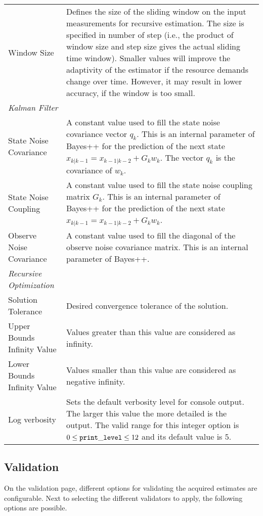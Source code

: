 \begin{tabularx}{\textwidth}{lX}
        Window Size &  Defines the size of the sliding window on the input
        measurements for recursive estimation. The
        size is specified in number of step (i.e., the product
        of window size and step size gives the actual sliding
        time window). Smaller values will improve the
        adaptivity of the estimator if the resource demands
        change over time. However, it may result in lower
        accuracy, if the window is too small.\\
        \textit{Kalman Filter} \\
        State Noise Covariance & A constant value used to fill the state noise covariance
        vector $q_k$. This is an internal parameter
        of Bayes++ for the prediction of the next state $ x_{k| k-1} = x_{k-1| k-2} + G_kw_k$. The vector $q_k$ is the
        covariance of $w_k$.\\
        State Noise Coupling &  A constant value used to fill the state noise coupling
        matrix $G_k$. This is an internal parameter
        of Bayes++ for the prediction of the next state
        $x_{k|k-1} = x_{k-1|k-2} + G_kw_k$.\\
        Observe Noise Covariance & A constant value used to fill the diagonal of the
        observe noise covariance matrix. This is an internal
        parameter of Bayes++. \\
        \textit{Recursive Optimization}\\
        Solution Tolerance & Desired convergence tolerance of the solution.\\
        Upper Bounds Infinity Value & Values greater than this value are considered as infinity. \\
        Lower Bounds Infinity Value & Values smaller than this value are considered as negative infinity.
\\
        Log verbosity & Sets the default verbosity level for console output. The larger this value the more detailed is the output. The valid range for this integer option is $ 0 \le {\tt print\_level } \le 12$ and its default value is $5$. \\
    \end{tabularx}

\subsection{Validation}
On the validation page, different options for validating the acquired estimates are configurable.
Next to selecting the different validators to apply, the following options are possible.

